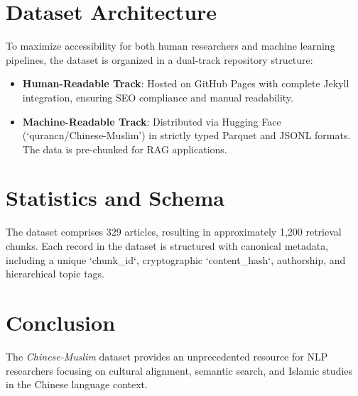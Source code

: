 \documentclass[11pt,a4paper]{article}
\begin{document}
\section{Dataset Architecture}
To maximize accessibility for both human researchers and machine learning pipelines, the dataset is organized in a dual-track repository structure:
\begin{itemize}
    \item \textbf{Human-Readable Track}: Hosted on GitHub Pages with complete Jekyll integration, ensuring SEO compliance and manual readability.
    \item \textbf{Machine-Readable Track}: Distributed via Hugging Face (`qurancn/Chinese-Muslim') in strictly typed Parquet and JSONL formats. The data is pre-chunked for RAG applications.
\end{itemize}

\section{Statistics and Schema}
The dataset comprises 329 articles, resulting in approximately 1,200 retrieval chunks. Each record in the dataset is structured with canonical metadata, including a unique `chunk\_id`, cryptographic `content\_hash`, authorship, and hierarchical topic tags.

\section{Conclusion}
The \textit{Chinese-Muslim} dataset provides an unprecedented resource for NLP researchers focusing on cultural alignment, semantic search, and Islamic studies in the Chinese language context. 
\end{document}
